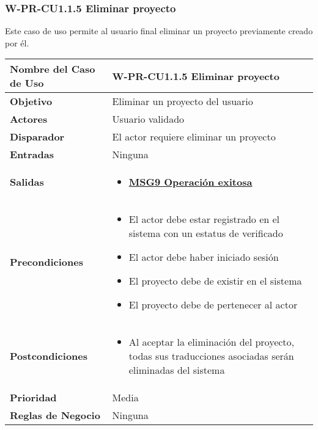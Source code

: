 \subsubsection{W-PR-CU1.1.5 Eliminar proyecto}
Este caso de uso permite al usuario final eliminar un proyecto previamente creado por él. 

\begin{longtable}{|J{5cm}|J{10.3cm}|}
	\hline
	\textbf{Nombre del Caso de Uso} &
		W-PR-CU1.1.5 Eliminar proyecto \\ \hline
	\textbf{Objetivo} &
		Eliminar un proyecto del usuario \\ \hline
	\textbf{Actores} &
		Usuario validado \\ \hline 
	\textbf{Disparador} & 
		El actor requiere eliminar un proyecto \\ \hline 
	\textbf{Entradas} & 
		Ninguna \\ \hline 
	\textbf{Salidas} & 
		\begin{itemize}
			\item \hyperref[MSG9]{\bf MSG9 Operación exitosa}
		\end{itemize} \\ \hline
	\textbf{Precondiciones} &
		\begin{itemize}
		    \item El actor debe estar registrado en el sistema con un estatus de verificado
		    \item El actor debe haber iniciado sesión
		    \item El proyecto debe de existir en el sistema
		    \item El proyecto debe de pertenecer al actor
		\end{itemize} \\ \hline
	\textbf{Postcondiciones} &
		\begin{itemize}
		    \item Al aceptar la eliminación del proyecto, todas sus traducciones asociadas serán eliminadas del sistema
		\end{itemize} \\ \hline
	\textbf{Prioridad} & 
		Media \\ \hline
	\textbf{Reglas de Negocio} & 
		Ninguna \\ \hline

\end{longtable}

